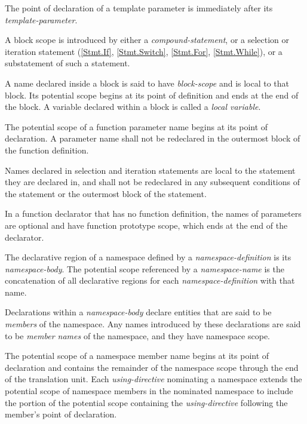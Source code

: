 \p The point of declaration of a template parameter is immediately after its
\textit{template-parameter}.


\p A block scope is introduced by either a \textit{compound-statement}, or a
selection or iteration statement (\ref{Stmt.If}, \ref{Stmt.Switch},
\ref{Stmt.For}, \ref{Stmt.While}), or a substatement of such a statement.

\p A name declared inside a block is said to have \textit{block-scope} and is
local to that block. Its potential scope begins at its point of definition and
ends at the end of the block. A variable declared within a block is called a
\textit{local variable}.

\p The potential scope of a function parameter name begins at its point of
declaration. A parameter name shall not be redeclared in the outermost block of
the function definition.

\p Names declared in selection and iteration statements are local to the
statement they are declared in, and shall not be redeclared in any subsequent
conditions of the statement or the outermost block of the statement.


\p In a function declarator that has no function definition, the names of
parameters are optional and have function prototype scope, which ends at the end
of the declarator.


\p The declarative region of a namespace defined by a
\textit{namespace-definition} is its \textit{namespace-body}. The potential
scope referenced by a \textit{namespace-name} is the concatenation of all
declarative regions for each \textit{namespace-definition} with that name.

\p Declarations within a \textit{namespace-body} declare entities that are said
to be \textit{members} of the namespace. Any names introduced by these
declarations are said to be \textit{member names} of the namespace, and they
have namespace scope.

\p The potential scope of a namespace member name begins at its point of
declaration and contains the remainder of the namespace scope through the end of
the translation unit. Each \textit{using-directive} nominating a namespace
extends the potential scope of namespace members in the nominated namespace to
include the portion of the potential scope containing the
\textit{using-directive} following the member's point of declaration.

